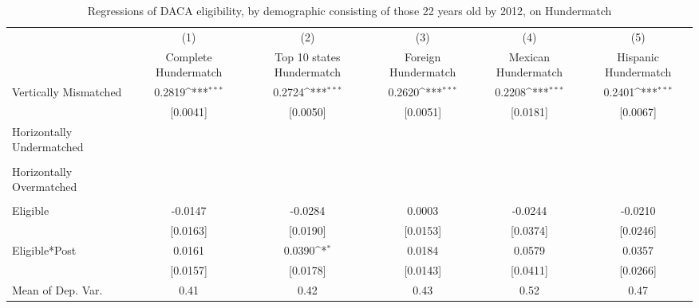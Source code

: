 \begin{table}[htbp]\centering
\def\sym#1{\ifmmode^{#1}\else\(^{#1}\)\fi}
\caption{Regressions of DACA eligibility, by demographic consisting of those 22 years old by 2012, on Hundermatch}
\begin{tabular}{l*{5}{c}}
\toprule
                    &\multicolumn{1}{c}{(1)}         &\multicolumn{1}{c}{(2)}         &\multicolumn{1}{c}{(3)}         &\multicolumn{1}{c}{(4)}         &\multicolumn{1}{c}{(5)}         \\
                    &Complete Hundermatch         &Top 10 states Hundermatch         &Foreign Hundermatch         &Mexican Hundermatch         &Hispanic Hundermatch         \\
\midrule
Vertically Mismatched&      0.2819\sym{***}&      0.2724\sym{***}&      0.2620\sym{***}&      0.2208\sym{***}&      0.2401\sym{***}\\
                    &    [0.0041]         &    [0.0050]         &    [0.0051]         &    [0.0181]         &    [0.0067]         \\
\addlinespace
Horizontally Undermatched&                     &                     &                     &                     &                     \\
                    &                     &                     &                     &                     &                     \\
\addlinespace
Horizontally Overmatched&                     &                     &                     &                     &                     \\
                    &                     &                     &                     &                     &                     \\
\addlinespace
Eligible            &     -0.0147         &     -0.0284         &      0.0003         &     -0.0244         &     -0.0210         \\
                    &    [0.0163]         &    [0.0190]         &    [0.0153]         &    [0.0374]         &    [0.0246]         \\
\addlinespace
Eligible*Post       &      0.0161         &      0.0390\sym{*}  &      0.0184         &      0.0579         &      0.0357         \\
                    &    [0.0157]         &    [0.0178]         &    [0.0143]         &    [0.0411]         &    [0.0266]         \\
\midrule
Mean of Dep. Var.   &        0.41         &        0.42         &        0.43         &        0.52         &        0.47         \\

\end{tabular}
\end{table}
